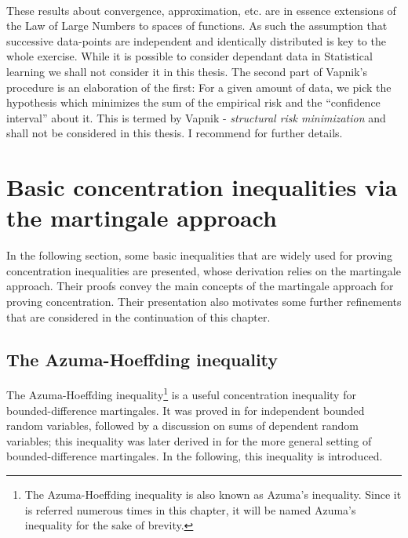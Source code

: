 \documentclass[12pt, oneside, a4paper]{article}
\theoremstyle{plain}
\theoremstyle{definition}
\begin{document}
\paragraph{}
These results about convergence, approximation, etc. are in essence extensions of the Law of Large Numbers to 
spaces of functions. As such the assumption that successive data-points are independent and 
identically distributed is key to the whole exercise. While it is possible to consider dependant data in Statistical learning
we shall not consider it in this thesis.
The second part of Vapnik's procedure is an elaboration of the first: For a given amount of data, we pick the hypothesis which 
minimizes the sum of the empirical risk and the ``confidence interval'' about it. This is termed by Vapnik - \textit{structural risk 
minimization} and shall not be considered in this thesis. I recommend \cite{vapnik2000nature} for further details. 



\section{Basic concentration inequalities via the martingale approach}
\label{section: Basic Concentration Inequalities}
\label{sec:ConcInequalities}
In the following section, some basic inequalities that are widely
used for proving concentration inequalities are presented, whose
derivation relies on the martingale approach. Their proofs convey
the main concepts of the martingale approach for proving concentration.
Their presentation also motivates some further refinements that are
considered in the continuation of this chapter.

\subsection{The Azuma-Hoeffding inequality}\label{subsection: Azuma's inequality}
The Azuma-Hoeffding inequality\footnote{The
Azuma-Hoeffding inequality is also known as Azuma's inequality.
Since it is referred numerous times in this chapter, it will be
named Azuma's inequality for the sake of
brevity.} is a useful concentration inequality for
bounded-difference martingales. It was proved in \cite{Hoeffding}
for independent bounded random variables, followed by a discussion
on sums of dependent random variables; this inequality was later
derived in \cite{Azuma} for the more general setting of
bounded-difference martingales. In the following, this inequality
is introduced.
\end{document}
